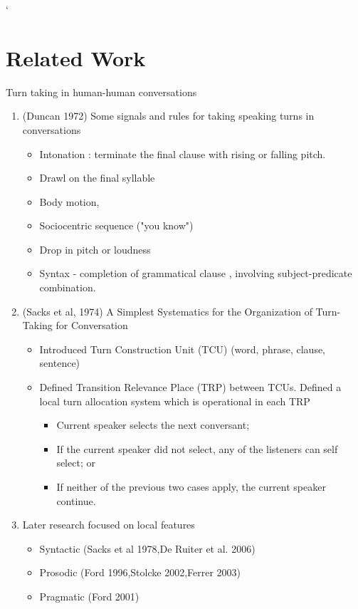 `%

\section{Related Work}
\frame{\sectionpage}


\begin{frame}{Turn taking in human-human conversations}
    \begin{enumerate}
       \item (Duncan 1972) Some signals and rules for taking speaking turns in conversations
          \begin{itemize}
            \item Intonation : terminate the final clause with rising or falling pitch.
            \item Drawl on the final syllable
            \item Body motion,
            \item Sociocentric sequence ("you know")
            \item Drop in pitch or loudness
            \item Syntax - completion of grammatical clause , involving subject-predicate combination.
          \end{itemize}
       \item (Sacks et al, 1974) A Simplest Systematics for the Organization of Turn-Taking for Conversation
          \begin{itemize}
            \item Introduced Turn Construction Unit (TCU) (word, phrase, clause, sentence)
            \item Defined Transition Relevance Place (TRP) between TCUs. Defined a local turn allocation system which is operational in each TRP
            \begin{itemize}
                \item Current speaker selects the next conversant;
                \item If the current speaker did not select, any of the listeners can self select; or
                \item If neither of the previous two cases apply, the current speaker continue.
            \end{itemize}
          \end{itemize}
       \item Later research focused on local features
        \begin{itemize}
            \item Syntactic (Sacks et al 1978,De Ruiter et al. 2006)
            \item Prosodic (Ford 1996,Stolcke 2002,Ferrer 2003)
            \item Pragmatic (Ford 2001)
        \end{itemize}
    \end{enumerate}
\end{frame}

